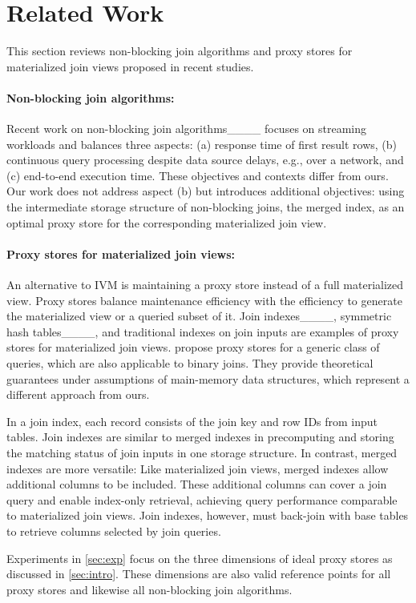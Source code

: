 \section{Related Work}
\label{sec:prior}

This section reviews non-blocking join algorithms and proxy stores for materialized join views proposed in recent studies.

\paragraph{Non-blocking join algorithms:}

Recent work on non-blocking join algorithms____ focuses on streaming workloads and balances three aspects: (a) response time of first result rows, (b) continuous query processing despite data source delays, e.g., over a network, and (c) end-to-end execution time.
These objectives and contexts differ from ours.
Our work does not address aspect (b) but introduces additional objectives: using the intermediate storage structure of non-blocking joins, the merged index, as an optimal proxy store for the corresponding materialized join view.

\paragraph{Proxy stores for materialized join views:}

An alternative to IVM is maintaining a proxy store instead of a full materialized view.
Proxy stores balance maintenance efficiency with the efficiency to generate the materialized view or a queried subset of it.
Join indexes____, symmetric hash tables____, and traditional indexes on join inputs are examples of proxy stores for materialized join views.
 propose proxy stores for a generic class of queries, which are also applicable to binary joins.
They provide theoretical guarantees under assumptions of main-memory data structures, which represent a different approach from ours.

In a join index, each record consists of the join key and row IDs from input tables.
Join indexes are similar to merged indexes in precomputing and storing the matching status of join inputs in one storage structure.
In contrast, merged indexes are more versatile:
Like materialized join views, merged indexes allow additional columns to be included.
These additional columns can cover a join query and enable index-only retrieval, achieving query performance comparable to materialized join views.
Join indexes, however, must back-join with base tables to retrieve columns selected by join queries.

Experiments in \cref{sec:exp} focus on the three dimensions of ideal proxy stores as discussed in \cref{sec:intro}.
These dimensions are also valid reference points for all proxy stores and likewise all non-blocking join algorithms.